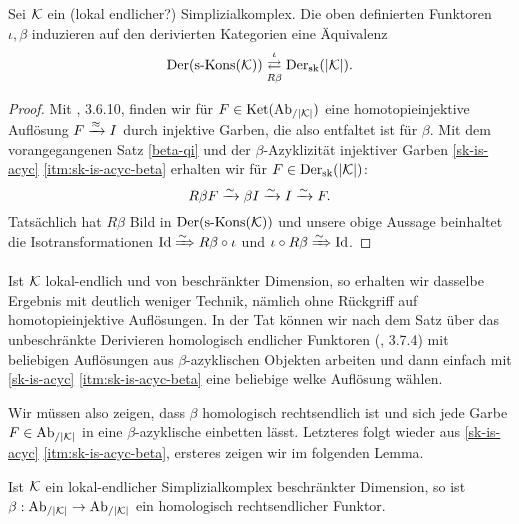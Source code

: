 \begin{theorem}
  Sei $\mathcal{K}$ ein (lokal endlicher?) Simplizialkomplex. Die oben definierten
  Funktoren $\iota, \beta$ induzieren auf den derivierten Kategorien
  eine Äquivalenz  
  \[ \operatorname{Der}(\operatorname{s-Kons}(\mathcal{K}))
  \mathrel{\mathop{\rightleftarrows}^{\iota}_{R \beta}}
  \operatorname{Der}_{\mathrm{sk}}(|\mathcal{K}|). \]
\end{theorem}
\begin{proof}

  Mit \cite{TD}, 3.6.10, finden wir für $F \in \operatorname{Ket}(\operatorname{Ab}_{/|\mathcal{K}|})$ eine
  homotopieinjektive Auflösung $F \xrightarrow{\approx} I$ durch injektive Garben, die
  also entfaltet ist für $\beta$. Mit dem vorangegangenen Satz
  \ref{beta-qi} und der $\beta$-Azyklizität injektiver Garben
  \ref{sk-is-acyc} \ref{itm:sk-is-acyc-beta} erhalten wir für $F \in
  \operatorname{Der}_{\mathrm{sk}}(|\mathcal{K}|)$:
  \[R \beta F \xrightarrow{\sim} \beta I \xrightarrow{\sim} I \xrightarrow{\sim} F. \]
  Tatsächlich hat $R \beta$ Bild in $\operatorname{Der}(\operatorname{s-Kons}(\mathcal{K}))$ und unsere
  obige Aussage beinhaltet die Isotransformationen $\operatorname{Id} \xRightarrow{\sim} R
  \beta \circ \iota$ und $\iota \circ R \beta \xRightarrow{\sim} \operatorname{Id}$.
\end{proof}
\begin{bem}
  Ist $\mathcal{K}$ lokal-endlich und von beschränkter Dimension, so erhalten
  wir dasselbe Ergebnis mit deutlich weniger Technik, nämlich ohne
  Rückgriff auf homotopieinjektive Auflösungen. In der Tat können wir
  nach dem Satz über das unbeschränkte Derivieren homologisch
  endlicher Funktoren (\cite{TG}, 3.7.4) mit beliebigen Auflösungen
  aus $\beta$-azyklischen Objekten arbeiten und dann einfach mit
  \ref{sk-is-acyc} \ref{itm:sk-is-acyc-beta} eine beliebige welke
  Auflösung wählen.

  Wir müssen also zeigen, dass $\beta$ homologisch rechtsendlich ist
  und sich jede Garbe $F \in \operatorname{Ab}_{/|\mathcal{K}|}$ in eine $\beta$-azyklische
  einbetten lässt. Letzteres folgt wieder aus \ref{sk-is-acyc}
  \ref{itm:sk-is-acyc-beta}, ersteres zeigen wir im folgenden Lemma.


\end{bem}
\begin{lemma}
  Ist $\mathcal{K}$ ein lokal-endlicher Simplizialkomplex beschränkter
  Dimension, so ist $\beta: \operatorname{Ab}_{/|\mathcal{K}|} \to \operatorname{Ab}_{/|\mathcal{K}|}$ ein homologisch
  rechtsendlicher Funktor.

\end{lemma}

